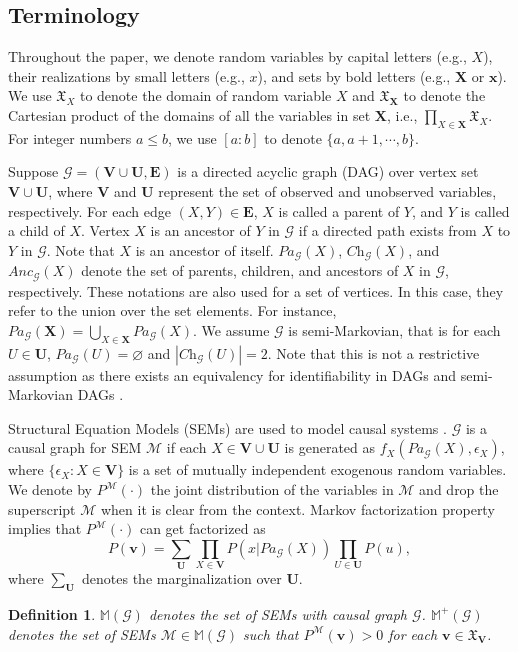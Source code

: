 \documentclass[accepted]{uai2022}
\newtheorem{definition}{Definition}
\newcommand{\Pa}[2]{\textit{Pa}_{#2}(#1)}
\newcommand{\Ch}[2]{\textit{Ch}_{#2}(#1)}
\newcommand{\Anc}[2]{\textit{Anc}_{#2}(#1)}
\newcommand{\V}[0]{\mathbf{V}}
\newcommand{\U}[0]{\mathbf{U}}
\newcommand{\E}[0]{\mathbf{E}}
\newcommand{\X}[0]{\mathbf{X}}
\newcommand{\x}[0]{\mathbf{x}}
\newcommand{\G}[0]{\mathcal{G}}
\newcommand{\M}[0]{\mathcal{M}}
\newcommand{\dom}[1]{\mathfrak{X}_{#1}}
\begin{document}
    \subsection{Terminology}
        Throughout the paper, we denote random variables by capital letters (e.g., $X$), their realizations by small letters (e.g., $x$), and sets by bold letters (e.g., $\X$ or $\x$). 
        We use $\dom{X}$ to denote the domain of random variable $X$ and $\dom{\X}$ to denote the Cartesian product of the domains of all the variables in set $\X$, i.e., $\prod_{X\in \X} \dom{X}$. 
        For integer numbers $a\leq b$, we use $[a:b]$ to denote $\{a,a+1,\cdots,b\}$.
        
        Suppose $\G=(\V \cup \U, \E)$ is a directed acyclic graph (DAG) over vertex set $\V \cup \U$, where $\V$ and $\U$ represent the set of observed and unobserved variables, respectively. 
        For each edge $(X, Y)\in \E$, $X$ is called a parent of $Y$, and $Y$ is called a child of $X$. 
        Vertex $X$ is an ancestor of $Y$ in $\G$ if a directed path exists from $X$ to $Y$ in $\G$.
        Note that $X$ is an ancestor of itself. 
        $\Pa{X}{\G}$, $\Ch{X}{\G}$, and $\Anc{X}{\G}$ denote the set of parents, children, and ancestors of $X$ in $\G$, respectively.
        These notations are also used for a set of vertices. 
        In this case, they refer to the union over the set elements. 
        For instance,  $\Pa{\X}{\G}=\bigcup_{X \in \X}\Pa{X}{\G}$.
        We assume $\G$ is semi-Markovian, that is for each $U \in \U$, $\Pa{U}{\G}= \varnothing$ and $|\Ch{U}{\G}|=2$. 
        Note that this is not a restrictive assumption as there exists an equivalency for identifiability in DAGs and semi-Markovian DAGs \citep{huang2006identifiability}.
        
        Structural Equation Models (SEMs) are used to model causal systems \citep{pearl2009causality}. 
        $\G$ is a causal graph for SEM $\mathcal{M}$ if each $X\!\in\! \V \cup \U$ is generated as $f_X(\Pa{X}{\G}, \epsilon_X)$, where $\{\epsilon_X\!: X\in \V\}$ is a set of mutually independent exogenous random variables.
        We denote by $P^{\M}(\cdot)$ the joint distribution of the variables in $\M$ and drop the superscript $\M$ when it is clear from the context.
        Markov factorization property implies that $P^{\M}(\cdot)$ can get factorized as
        \begin{equation} \label{eq: factorization 1}
            P(\mathbf{v})= \sum_{\U} \prod_{X \in \V}P(x|\Pa{X}{\G}) \prod_{U\in \U}P(u),
        \end{equation}
        where $\sum_{\U}$ denotes the marginalization over $\U$.
        \begin{definition}
            $\mathbb{M}(\G)$ denotes the set of SEMs with causal graph $\G$. 
            $\mathbb{M}^{+}(\G)$ denotes the set of SEMs $\M \in \mathbb{M}(\G)$  such that $P^{\M}(\mathbf{v})>0$ for each $\mathbf{v} \in \dom{\V}$.
        \end{definition}
        
\end{document}
